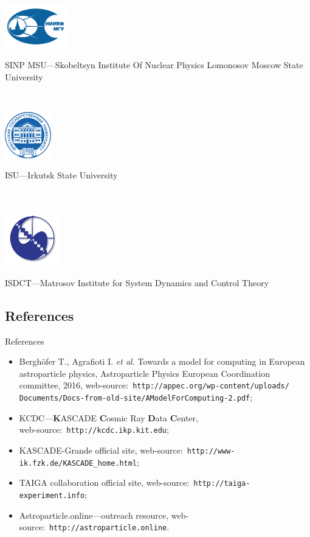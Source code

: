 \begin{frame}[allowframebreaks]
{}
\\\vspace{1em}
\parbox{0.20\textwidth}{
  \centering\includegraphics[width=0.20\textwidth]{pics/SINP_MSU_LOGO.pdf}
}\hfill
\parbox{0.75\textwidth}{
  SINP MSU---Skobeltsyn Institute Of Nuclear Physics Lomonosov Moscow State University
}
\\\vspace{1em}
\parbox{0.20\textwidth}{
  \centering\includegraphics[width=0.15\textwidth]{pics/isu_logo.png}
}\hfill
\parbox{0.75\textwidth}{
  ISU---Irkutsk State University
}
\\\vspace{1em}
\parbox{0.20\textwidth}{
  \centering\includegraphics[width=0.18\textwidth]{pics/matr_logo.png}
}\hfill
\parbox{0.75\textwidth}{
  ISDCT---Matrosov Institute for System Dynamics and Control Theory
}
\end{frame}

\subsection{References}
    \begin{frame}{References}
        \begin{itemize}
            \item Berghöfer T., Agrafioti I. \textit{et al.} Towards a model for computing in European astroparticle physics,
            Astroparticle Physics European Coordination committee, 2016,
            web-source:~\texttt{http://appec.org/wp-content/uploads/\\Documents/Docs-from-old-site/AModelForComputing-2.pdf};
            \item KCDC---\textbf{K}ASCADE \textbf{C}osmic Ray \textbf{D}ata \textbf{C}enter,\\
            web-source:~\texttt{http://kcdc.ikp.kit.edu};
            \item KASCADE-Grande official site, web-source:~\texttt{http://www-ik.fzk.de/KASCADE\_home.html};
            \item TAIGA collaboration official site, web-source:~\texttt{http://taiga-experiment.info};
            \item Astroparticle.online---outreach resource, web-source:~\texttt{http://astroparticle.online}.
        \end{itemize}
    \end{frame}
\backupend
